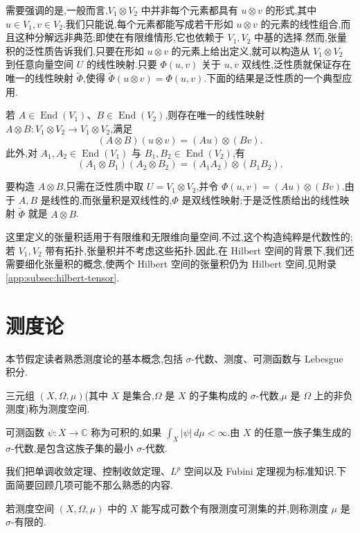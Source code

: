需要强调的是,一般而言,\(V_1\otimes V_2\) 中并非每个元素都具有 \(u\otimes v\) 的形式,其中 \(u\in V_1,v\in V_2\).我们只能说,每个元素都能写成若干形如 \(u\otimes v\) 的元素的线性组合,而且这种分解远非典范;即使在有限维情形,它也依赖于 \(V_1,V_2\) 中基的选择.然而,张量积的泛性质告诉我们,只要在形如 \(u\otimes v\) 的元素上给出定义,就可以构造从 \(V_1\otimes V_2\) 到任意向量空间 \(U\) 的线性映射.只要 \(\Phi(u,v)\) 关于 \(u,v\) 双线性,泛性质就保证存在唯一的线性映射 \(\widetilde\Phi\),使得 \(\widetilde\Phi(u\otimes v)=\Phi(u,v)\).下面的结果是泛性质的一个典型应用.

\begin{proposition}[算子的张量积]\label{app:prop:tensor-operators}
若 \(A\in\operatorname{End}(V_1)\)、\(B\in\operatorname{End}(V_2)\),则存在唯一的线性映射 \(A\otimes B:V_1\otimes V_2\to V_1\otimes V_2\),满足
\[
(A\otimes B)(u\otimes v)=(Au)\otimes(Bv).
\]
此外,对 \(A_1,A_2\in\operatorname{End}(V_1)\) 与 \(B_1,B_2\in\operatorname{End}(V_2)\),有
\[
(A_1\otimes B_1)(A_2\otimes B_2)=(A_1A_2)\otimes(B_1B_2).
\]
\end{proposition}

要构造 \(A\otimes B\),只需在泛性质中取 \(U=V_1\otimes V_2\),并令 \(\Phi(u,v)=(Au)\otimes(Bv)\).由于 \(A,B\) 是线性的,而张量积是双线性的,\(\Phi\) 是双线性映射;于是泛性质给出的线性映射 \(\widetilde\Phi\) 就是 \(A\otimes B\).

这里定义的张量积适用于有限维和无限维向量空间.不过,这个构造纯粹是代数性的;若 \(V_1,V_2\) 带有拓扑,张量积并不考虑这些拓扑.因此,在 Hilbert 空间的背景下,我们还需要细化张量积的概念,使两个 Hilbert 空间的张量积仍为 Hilbert 空间,见附录 \ref{app:subsec:hilbert-tensor}.

\section{测度论}

本节假定读者熟悉测度论的基本概念,包括 \(\sigma\)-代数、测度、可测函数与 Lebesgue 积分.

三元组 \((X,\Omega,\mu)\)(其中 \(X\) 是集合,\(\Omega\) 是 \(X\) 的子集构成的 \(\sigma\)-代数,\(\mu\) 是 \(\Omega\) 上的非负测度)称为测度空间.

可测函数 \(\psi:X\to\mathbb C\) 称为可积的,如果 \(\int_X|\psi|\,d\mu<\infty\).由 \(X\) 的任意一族子集生成的 \(\sigma\)-代数,是包含这族子集的最小 \(\sigma\)-代数.

我们把单调收敛定理、控制收敛定理、\(L^p\) 空间以及 Fubini 定理视为标准知识.下面简要回顾几项可能不那么熟悉的内容.

若测度空间 \((X,\Omega,\mu)\) 中的 \(X\) 能写成可数个有限测度可测集的并,则称测度 \(\mu\) 是 \(\sigma\)-有限的.

